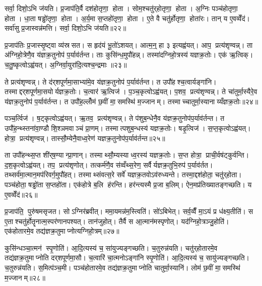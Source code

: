 सर्वा॒ दिशो॒ऽभि ज॑यति। प्र॒जाप॑ति॒र्वै दश॑होतृणा॒ होता। सोम॒श्चतु॑र्‌होतृणा॒ होता। अ॒ग्निः पञ्च॑होतृणा॒ होता। धा॒ता षड्ढो॑तृणा॒ होता। अ॒र्य॒मा स॒प्तहो॑तृणा॒ होता। ए॒ते वै चतु॑र्\mbox{}होतृणा॒ होता॑रः। तान् य ए॒वव्वेँद॑। सर्वा॑सु प्र॒जास्वन्न॑मत्ति। सर्वा॒ दिशो॒ऽभि ज॑यति॥२२॥\anuvakamend[आ॒र्ध्नु॒व॒न्ना॒र्ध्नु॒व॒न्नित्ये॒वव्वेँदात्ति सर्वा॒ दिशो॒ऽभि ज॑यति (वै तेन॑ स॒त्रङ्केन॑ ॥ )]

प्र॒जाप॑तिः प्र॒जास्सृ॒ष्ट्वा व्य॑स्रसत। स हृद॑यं भू॒तो॑ऽशयत्। आत्म॒न्॒ हा ३ इत्यह्व॑यत्। आप॒ प्रत्य॑शृण्वन्न्। ता अ॑ग्निहो॒त्रेणै॒व य॑ज्ञक्र॒तुनोप॑ प॒र्याव॑र्तन्त। ताः कुसि॑न्ध॒मुपौ॑हन्न्। तस्मा॑दग्निहो॒त्रस्य॑ यज्ञक्र॒तोः। एक॑ ऋ॒त्विक्। च॒तु॒ष्कृत्वोऽह्व॑यत्। अ॒ग्निर्वा॒युरा॑दि॒त्यश्च॒न्द्रमाः॥२३॥

ते प्रत्य॑शृण्वन्न्। ते द॑र्‌शपूर्णमा॒साभ्या॑मे॒व य॑ज्ञक्र॒तुनोप॑ प॒र्याव॑र्तन्त। त उपौ॑हश्च॒त्वार्यङ्गा॑नि। तस्माद्दर्‌शपूर्णमा॒सयोर्यज्ञक्र॒तोः। च॒त्वार॑ ऋ॒त्विज॑। प॒ञ्च॒कृत्वोऽह्व॑यत्। प॒शव॒ प्रत्य॑शृण्वन्न्। ते चा॑तुर्मा॒स्यैरे॒व य॑ज्ञक्र॒तुनोप॑ प॒र्याव॑र्तन्त। त उपौ॑ह॒ल्लोँम॑ छ॒वीं मा॒समस्थि॑ म॒ज्जानम्। तस्माच्चातुर्मा॒स्यानाय्यँज्ञक्र॒तोः॥२४॥

पञ्च॒र्त्विज॑। ष॒ट्कृत्वोऽह्व॑यत्। ऋ॒तव॒ प्रत्य॑शृण्वन्न्। ते प॑शुब॒न्धेनै॒व य॑ज्ञक्र॒तुनोप॑प॒र्याव॑र्तन्त। त उपौ॑ह॒न्थ्स्तना॑वा॒ण्डौ शि॒श्ञमवाञ्चं प्रा॒णम्। तस्मात्पशुब॒न्धस्य॑ यज्ञक्र॒तोः। षडृ॒त्विज॑। स॒प्त॒कृत्वोऽह्व॑यत्। होत्रा॒ प्रत्य॑शृण्वन्न्। तास्सौ॒म्येनै॒वाध्व॒रेण॑ यज्ञक्र॒तुनोप॑प॒र्याव॑र्तन्त॥२५॥

ता उपौ॑हन्थ्स॒प्त शी॑र्‌ष॒ण्यान्प्रा॒णान्। तस्माथ्सौ॒म्यस्याध्व॒रस्य॑ यज्ञक्र॒तोः। स॒प्त होत्रा॒ प्राची॒र्वष॑ट्कुर्वन्ति। द॒श॒कृत्वोऽह्व॑यत्। तप॒ प्रत्य॑शृणोत्। तत्कर्म॑णै॒व स॑व्वँथ्स॒रेण॒ सर्वैर्यज्ञक्र॒तुभि॒रुप॑ प॒र्याव॑र्तत। तथ्सर्व॑मा॒त्मान॒मप॑रिवर्ग॒मुपौ॑हत्। तस्माथ्संवत्स॒रे सर्वे॑ यज्ञक्र॒तवोऽव॑रुध्यन्ते। तस्मा॒द्दश॑होता॒ चतु॑र्‌होता। पञ्च॑होता॒ षड्ढो॑ता स॒प्तहो॑ता। एक॑होत्रे ब॒लि ह॑रन्ति। हर॑न्त्यस्मै प्र॒जा ब॒लिम्। ऐन॒मप्र॑तिख्यातङ्गच्छति। य ए॒वव्वेँद॑॥२६॥\anuvakamend[च॒न्द्रमाश्चातुर्मा॒स्यानाय्यँज्ञक्र॒तोर॑ध्व॒रेण॑ यज्ञक्र॒तुनोप॑ प॒र्याव॑र्तन्त स॒प्तहो॑ता च॒त्वारि॑ च]

प्र॒जाप॑ति॒ पुरु॑षमसृजत। सोऽग्निर॑ब्रवीत्। ममा॒यमन्न॑म॒स्त्विति॑। सो॑ऽबिभेत्। सर्व॒व्वैँ मा॒ऽयं प्र ध॑क्ष्य॒तीति॑। स ए॒ताश्चतु॑र्\mbox{}होतॄनात्म॒स्पर॑णानपश्यत्। तान॑जुहोत्। तैर्वै स आ॒त्मान॑मस्पृणोत्। यद॑ग्निहो॒त्रञ्जु॒होति॑। एक॑होतारमे॒व तद्य॑ज्ञक्र॒तुमाप्नोत्यग्निहो॒त्रम्॥२७॥

कुसि॑न्धञ्चा॒त्मन॑ स्पृ॒णोति॑। आ॒दि॒त्यस्य॑ च॒ सा॑युज्यङ्गच्छति। च॒तुरुन्न॑यति। चतु॑र्‌होतारमे॒व तद्य॑ज्ञक्र॒तुमाप्नोति दर्‌शपूर्णमा॒सौ। च॒त्वारि॑ चा॒त्मनोऽङ्गा॑नि स्पृ॒णोति॑। आ॒दि॒त्यस्य॑ च॒ सायु॑ज्यङ्गच्छति। च॒तुरुन्न॑यति। स॒मित्प॑ञ्च॒मी। पञ्च॑होतारमे॒व तद्य॑ज्ञक्र॒तुमाप्नोति चातुर्मा॒स्यानि॑। लोम॑ छ॒वीं मा॒समस्थि॑ म॒ज्जानम्॥२८॥

